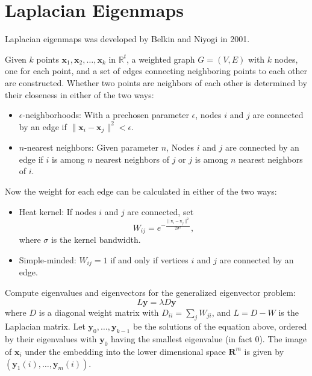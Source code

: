 \section{Laplacian Eigenmaps\label{Sec:DR:LE}}
Laplacian eigenmaps was developed by Belkin and Niyogi in 2001.\cite{BelkinANIPS2001}

Given $k$ points $\mathbf{x}_1, \mathbf{x}_2,\dots, \mathbf{x}_k$ in $\mathbb{R}^t$, a weighted graph $G=(V,E)$ with $k$ nodes, one for each point, and a set of edges connecting neighboring points to each other are constructed. Whether two points are neighbors of each other is determined by their closeness in either of the two ways:
\begin{itemize}
	\item $\epsilon$-neighborhoods: With a prechosen parameter $\epsilon$, nodes $i$ and $j$ are connected by an edge if $\lVert \mathbf{x}_i-\mathbf{x}_j\rVert^2<\epsilon$.
	\item $n$-nearest neighbors: Given parameter $n$, Nodes $i$ and $j$ are connected by an edge if $i$ is among $n$ nearest neighbors of $j$ or $j$ is among $n$ nearest neighbors of $i$.
\end{itemize}

Now the weight for each edge can be calculated in either of the two ways:
\begin{itemize}
	\item Heat kernel: If nodes $i$ and $j$ are connected, set
	\begin{equation}
	    W_{ij}=e^{-\frac{\lVert \mathbf{x}_i-\mathbf{x}_j\rVert^2}{2\sigma^2}},
	\end{equation}
	where $\sigma$ is the kernel bandwidth.
	
	\item Simple-minded: $W_{ij}=1$ if and only if vertices $i$ and $j$ are connected by an edge.
\end{itemize}

Compute eigenvalues and eigenvectors for the generalized eigenvector problem:
\begin{equation}
    L\mathbf{y}=\lambda D\mathbf{y}
\end{equation}
where $D$ is a diagonal weight matrix with $D_{ii}=\sum_j W_{ji}$, and $L=D-W$ is the Laplacian matrix. Let $\mathbf{y}_0, \dots, \mathbf{y}_{k-1}$ be the solutions of the equation above, ordered by their eigenvalues with $\mathbf{y}_0$ having the smallest eigenvalue (in fact 0). The image of $\mathbf{x}_i$ under the embedding into the lower dimensional space $\mathbf{R}^m$ is given by $(\mathbf{y}_1(i),\dots, \mathbf{y}_m(i))$. 

